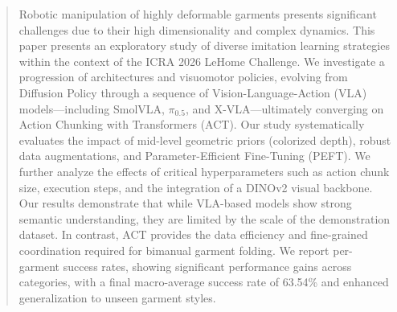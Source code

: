 \begin{abstract}
Robotic manipulation of highly deformable garments presents significant challenges due to their high dimensionality and complex dynamics. This paper presents an exploratory study of diverse imitation learning strategies within the context of the ICRA 2026 LeHome Challenge. We investigate a progression of architectures and visuomotor policies, evolving from Diffusion Policy through a sequence of Vision-Language-Action (VLA) models—including SmolVLA, $\pi_{0.5}$, and X-VLA—ultimately converging on Action Chunking with Transformers (ACT). Our study systematically evaluates the impact of mid-level geometric priors (colorized depth), robust data augmentations, and Parameter-Efficient Fine-Tuning (PEFT). We further analyze the effects of critical hyperparameters such as action chunk size, execution steps, and the integration of a DINOv2 visual backbone. Our results demonstrate that while VLA-based models show strong semantic understanding, they are limited by the scale of the demonstration dataset. In contrast, ACT provides the data efficiency and fine-grained coordination required for bimanual garment folding. We report per-garment success rates, showing significant performance gains across categories, with a final macro-average success rate of 63.54\% and enhanced generalization to unseen garment styles.
\end{abstract}
